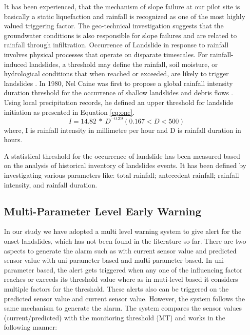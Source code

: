\documentclass[conference]{IEEEtran}
\begin{document}
\par
It has been experienced, that the mechanism of slope failure at our pilot site is basically a static liquefaction and rainfall is
recognized as one of the most highly valued triggering factor. The geo-technical investigation suggests that the groundwater conditions is also responsible for slope failures and are related to rainfall through infiltration. Occurrence of Landslide in response to rainfall involves physical processes that operate on disparate timescales. For rainfall-induced landslides, a threshold may define the rainfall, soil moisture, or hydrological conditions that when reached or exceeded, are likely to trigger landslides \cite{richard}. In 1980, Nel Caine was first to propose a global rainfall intensity duration threshold for the occurrence of shallow landslides and debris flows \cite{yang}. Using local precipitation records, he defined an upper threshold for landslide initiation as presented in Equation \ref{eq:one}.
\begin{equation}
I = 14.82~*~D^{-0.39}(0.167 < D < 500)
\label{eq:one}
\end{equation}
where, I is rainfall intensity in millimetre per hour and D is rainfall duration in hours.
\par
A statistical threshold for the occurrence of landslide has been measured based on the analysis of historical inventory of
landslides events. It has been defined by investigating various parameters like: total rainfall; antecedent rainfall; rainfall
intensity, and rainfall duration.

\subsection{Multi-Parameter Level Early Warning}
In our study we have adopted a multi level warning system to give alert for the onset landslides, which has not been found
in the literature so far. There are two aspects to generate the alarm such as with current sensor value and predicted sensor value with uni-parameter based and multi-parameter based. In uni-parameter based, the alert gets triggered when any one of the influencing factor reaches or exceeds its threshold value where as in muti-level based it considers multiple factors for the threshold. These alerts also can be triggered on the predicted sensor value and current sensor value. However, the system follows the same mechanism to generate the alarm. The system compares the sensor values (current/predicted) with the monitoring threshold (MT) and works in the following manner:
\end{document}
